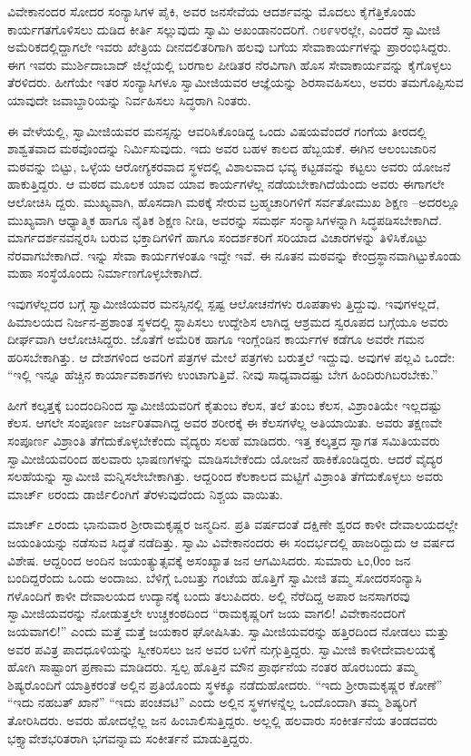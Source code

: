 ವಿವೇಕಾನಂದರ ಸೋದರ ಸಂನ್ಯಾಸಿಗಳ ಪೈಕಿ, ಅವರ ಜನಸೇವೆಯ ಆದರ್ಶವನ್ನು ಮೊದಲು ಕೈಗೆತ್ತಿಕೊಂಡು ಕಾರ್ಯಗತಗೊಳಿಸಲು ದುಡಿದ ಕೀರ್ತಿ ಸಲ್ಲುವುದು ಸ್ವಾಮಿ ಅಖಂಡಾನಂದರಿಗೆ. ೧೮೯೪ರಲ್ಲೇ, ಎಂದರೆ ಸ್ವಾಮೀಜಿ ಅಮೆರಿಕದಲ್ಲಿದ್ದಾಗಲೇ ಇವರು ಖೇತ್ರಿಯ ದೀನದಲಿತರಿಗಾಗಿ ಹಲವು ಬಗೆಯ ಸೇವಾಕಾರ್ಯಗಳನ್ನು ಪ್ರಾರಂಭಿಸಿದ್ದರು. ಈಗ ಇವರು ಮುರ್ಶಿದಾಬಾದ್ ಜಿಲ್ಲೆಯಲ್ಲಿ ಬರಗಾಲ ಪೀಡಿತರ ನೆರವಿಗಾಗಿ ಹೊಸ ಸೇವಾಕಾರ್ಯವನ್ನು ಕೈಗೊಳ್ಳಲು ತೆರಳಿದರು. ಹೀಗೆಯೇ ಇತರ ಸಂನ್ಯಾಸಿಗಳೂ ಸ್ವಾಮೀಜಿಯವರ ಆಜ್ಞೆಯನ್ನು ಶಿರಸಾವಹಿಸಲು, ಅವರು ತಮಗೊಪ್ಪಿಸುವ ಯಾವುದೇ ಜವಾಬ್ದಾರಿಯನ್ನು ನಿರ್ವಹಿಸಲು ಸಿದ್ಧರಾಗಿ ನಿಂತರು.

ಈ ವೇಳೆಯಲ್ಲಿ, ಸ್ವಾಮೀಜಿಯವರ ಮನಸ್ಸನ್ನು ಆವರಿಸಿಕೊಂಡಿದ್ದ ಒಂದು ವಿಷಯವೆಂದರೆ ಗಂಗೆಯ ತೀರದಲ್ಲಿ ಶಾಶ್ವತವಾದ ಮಠವೊಂದನ್ನು ನಿರ್ಮಿಸುವುದು. ಇದು ಅವರ ಬಹಳ ಕಾಲದ ಹೆಬ್ಬಯಕೆ. ಈಗಿನ ಆಲಂಬಜಾರಿನ ಮಠವನ್ನು ಬಿಟ್ಟು, ಒಳ್ಳೆಯ ಆರೋಗ್ಯಕರವಾದ ಸ್ಥಳದಲ್ಲಿ ವಿಶಾಲವಾದ ಭವ್ಯ ಕಟ್ಟಡವನ್ನು ಕಟ್ಟಲು ಅವರು ಯೋಜನೆ ಹಾಕುತ್ತಿದ್ದರು. ಆ ಮಠದ ಮೂಲಕ ಯಾವ ಯಾವ ಕಾರ್ಯಗಳೆಲ್ಲ ನಡೆಯಬೇಕಾಗಿದೆಯೆಂದು ಅವರು ಈಗಾಗಲೇ ಆಲೋಚಿಸಿ ದ್ದರು. ಮುಖ್ಯವಾಗಿ, ಹೊಸದಾಗಿ ಮಠಕ್ಕೆ ಸೇರುವ ಬ್ರಹ್ಮಚಾರಿಗಳಿಗೆ ಸರ್ವತೋಮುಖ ಶಿಕ್ಷಣ –ಅದರಲ್ಲೂ ಮುಖ್ಯವಾಗಿ ಆಧ್ಯಾತ್ಮಿಕ ಹಾಗೂ ನೈತಿಕ ಶಿಕ್ಷಣ ನೀಡಿ, ಅವರನ್ನು ಸಮರ್ಥ ಸಂನ್ಯಾಸಿಗಳನ್ನಾಗಿ ಸಿದ್ಧಪಡಿಸಬೇಕಾಗಿದೆ. ಮಾರ್ಗದರ್ಶನವನ್ನರಸಿ ಬರುವ ಭಕ್ತಾದಿಗಳಿಗೆ ಹಾಗೂ ಸಂದರ್ಶಕರಿಗೆ ಸರಿಯಾದ ವಿಚಾರಗಳನ್ನು ತಿಳಿಸಿಕೊಟ್ಟು ನೆರವಾಗಬೇಕಾಗಿದೆ. ಇನ್ನು ಸೇವಾ ಕಾರ್ಯಗಳಂತೂ ಇದ್ದೇ ಇವೆ. ಈ ನೂತನ ಮಠವನ್ನು ಕೇಂದ್ರಸ್ಥಾನವಾಗಿಟ್ಟುಕೊಂಡು ಮಹಾ ಸಂಸ್ಥೆಯೊಂದು ನಿರ್ಮಾಣಗೊಳ್ಳಬೇಕಾಗಿದೆ.

ಇವುಗಳೆಲ್ಲದರ ಬಗ್ಗೆ ಸ್ವಾಮೀಜಿಯವರ ಮನಸ್ಸಿನಲ್ಲಿ ಸ್ಪಷ್ಟ ಆಲೋಚನೆಗಳು ರೂಪತಾಳು ತ್ತಿದ್ದುವು. ಇವುಗಳಲ್ಲದೆ, ಹಿಮಾಲಯದ ನಿರ್ಜನ-ಪ್ರಶಾಂತ ಸ್ಥಳದಲ್ಲಿ ಸ್ಥಾಪಿಸಲು ಉದ್ದೇಶಿಸ ಲಾಗಿದ್ದ ಆಶ್ರಮದ ಸ್ವರೂಪದ ಬಗ್ಗೆಯೂ ಅವರು ದೀರ್ಘವಾಗಿ ಆಲೋಚಿಸಿದ್ದರು. ಜೊತೆಗೆ ಅಮೆರಿಕ ಹಾಗೂ ಇಂಗ್ಲೆಂಡಿನ ಕಾರ್ಯಗಳ ಕಡೆಗೂ ಅವರೇ ಗಮನ ಹರಿಸಬೇಕಾಗಿತ್ತು. ಆ ದೇಶಗಳಿಂದ ಅವರಿಗೆ ಪತ್ರಗಳ ಮೇಲೆ ಪತ್ರಗಳು ಬರುತ್ತಲೆ ಇದ್ದುವು. ಅವುಗಳ ಪಲ್ಲವಿ ಒಂದೇ: “ಇಲ್ಲಿ ಇನ್ನೂ ಹೆಚ್ಚಿನ ಕಾರ್ಯಾವಕಾಶಗಳು ಉಂಟಾಗುತ್ತಿವೆ. ನೀವು ಸಾಧ್ಯವಾದಷ್ಟು ಬೇಗ ಹಿಂದಿರುಗಿಬರಬೇಕು.”

ಹೀಗೆ ಕಲ್ಕತ್ತಕ್ಕೆ ಬಂದಂದಿನಿಂದ ಸ್ವಾಮೀಜಿಯವರಿಗೆ ಕೈತುಂಬ ಕೆಲಸ, ತಲೆ ತುಂಬ ಕೆಲಸ, ವಿಶ್ರಾಂತಿಯೇ ಇಲ್ಲದಷ್ಟು ಕೆಲಸ. ಆಗಲೇ ಸಂಪೂರ್ಣ ಜರ್ಜರಿತವಾಗಿದ್ದ ಅವರ ಶರೀರಕ್ಕೆ ಈ ಕೆಲಸಗಳೆಲ್ಲ ಅತಿಯಾಯಿತು. ಅವರು ತಕ್ಷಣವೇ ಸಂಪೂರ್ಣ ವಿಶ್ರಾಂತಿ ತೆಗೆದುಕೊಳ್ಳಬೇಕೆಂದು ವೈದ್ಯರು ಸಲಹೆ ಮಾಡಿದರು. ಇತ್ತ ಕಲ್ಕತ್ತದ ಸ್ವಾಗತ ಸಮಿತಿಯವರು ಸ್ವಾಮೀಜಿಯವರಿಂದ ಹಲವಾರು ಭಾಷಣಗಳನ್ನು ಮಾಡಿಸಬೇಕೆಂದು ಯೋಜನೆ ಹಾಕಿಕೊಂಡಿದ್ದರು. ಆದರೆ ವೈದ್ಯರ ಸಲಹೆಯನ್ನು ಸ್ವಾಮೀಜಿ ಮನ್ನಿಸಲೇಬೇಕಾಗಿತ್ತು. ಆದ್ದರಿಂದ ಕೆಲಕಾಲದ ಮಟ್ಟಿಗೆ ವಿಶ್ರಾಂತಿ ತೆಗೆದುಕೊಳ್ಳಲು ಅವರು ಮಾರ್ಚ್ ೮ರಂದು ಡಾರ್ಜಿಲಿಂಗಿಗೆ ತೆರಳುವುದೆಂದು ನಿಶ್ಚಯ ವಾಯಿತು.

ಮಾರ್ಚ್ ೭ರಂದು ಭಾನುವಾರ ಶ್ರೀರಾಮಕೃಷ್ಣರ ಜನ್ಮದಿನ. ಪ್ರತಿ ವರ್ಷದಂತೆ ದಕ್ಷಿಣೇ ಶ್ವರದ ಕಾಳೀ ದೇವಾಲಯದಲ್ಲೇ ಜಯಂತಿಯನ್ನು ನಡೆಸುವ ಸಿದ್ಧತೆ ನಡೆದಿತ್ತು. ಸ್ವಾಮಿ ವಿವೇಕಾನಂದರು ಈ ಸಂದರ್ಭದಲ್ಲಿ ಹಾಜರಿದ್ದುದು ಆ ವರ್ಷದ ವಿಶೇಷ. ಆದ್ದರಿಂದ ಅಂದಿನ ಜಯಂತ್ಯುತ್ಸವಕ್ಕೆ ಅಸಂಖ್ಯಾತ ಜನ ಆಗಮಿಸಿದರು. ಸುಮಾರು ೬ಂ,0ಂಂ ಜನ ಬಂದಿದ್ದರೆಂದು ಒಂದು ಅಂದಾಜು. ಬೆಳಿಗ್ಗೆ ಒಂಬತ್ತು ಗಂಟೆಯ ಹೊತ್ತಿಗೆ ಸ್ವಾಮೀಜಿ ತಮ್ಮ ಸೋದರಸಂನ್ಯಾಸಿ ಗಳೊಂದಿಗೆ ಕಾಳೀ ದೇವಾಲಯದ ಉದ್ಯಾನಕ್ಕೆ ಬಂದು ತಲುಪಿದರು. ಅಲ್ಲಿ ನೆರೆದಿದ್ದ ಅಪಾರ ಜನಸಾಗರವು ಸ್ವಾಮೀಜಿಯವರನ್ನು ನೋಡುತ್ತಲೇ ಉಚ್ಚಕಂಠದಿಂದ “ರಾಮಕೃಷ್ಣರಿಗೆ ಜಯ ವಾಗಲಿ! ವಿವೇಕಾನಂದರಿಗೆ ಜಯವಾಗಲಿ!” ಎಂದು ಮತ್ತೆ ಮತ್ತೆ ಜಯಕಾರ ಘೋಷಿಸಿತು. ಸ್ವಾಮೀಜಿಯವರನ್ನು ಹತ್ತಿರದಿಂದ ನೋಡಲು ಮತ್ತು ಅವರ ಪವಿತ್ರ ಪಾದಧೂಳಿಯನ್ನು ಸ್ವೀಕರಿಸಲು ಜನ ಅವರ ಬಳಿಗೆ ನುಗ್ಗುತ್ತಿದ್ದರು. ಸ್ವಾಮೀಜಿ ಕಾಳೀದೇವಾಲಯಕ್ಕೆ ಹೋಗಿ ಸಾಷ್ಟಾಂಗ ಪ್ರಣಾಮ ಮಾಡಿದರು. ಸ್ವಲ್ಪ ಹೊತ್ತಿನ ಮೌನ ಪ್ರಾರ್ಥನೆಯ ನಂತರ ಹೊರಬಂದು ತಮ್ಮ ಶಿಷ್ಯರೊಂದಿಗೆ ಯಾತ್ರಿಕರಂತೆ ಅಲ್ಲಿನ ಪ್ರತಿಯೊಂದು ಸ್ಥಳಕ್ಕೂ ನಡೆದುಹೋದರು. “ಇದು ಶ್ರೀರಾಮಕೃಷ್ಣರ ಕೋಣೆ” “ಇದು ನಹಬತ್ ಖಾನೆ” “ಇದು ಪಂಚವಟಿ” ಎಂದು ಅಲ್ಲಿನ ಸ್ಥಳಗಳನ್ನೆಲ್ಲ ಒಂದೊಂದಾಗಿ ತಮ್ಮ ಶಿಷ್ಯರಿಗೆ ತೋರಿಸಿದರು. ಅವರು ಹೋದಲ್ಲೆಲ್ಲ ಜನ ಹಿಂಬಾಲಿಸುತ್ತಿದ್ದರು. ಅಲ್ಲಲ್ಲಿ ಹಲವಾರು ಸಂಕೀರ್ತನೆಯ ತಂಡದವರು ಭಕ್ತ್ಯಾವೇಶಭರಿತರಾಗಿ ಭಗವನ್ನಾಮ ಸಂಕೀರ್ತನೆ ಮಾಡುತ್ತಿದ್ದರು.

